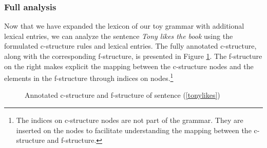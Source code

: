 \subsubsection{Full analysis}

Now that we have expanded the lexicon of our toy grammar with additional lexical entries, we can analyze the sentence \textit{Tony likes the book} using the formulated c-structure rules and lexical entries. The fully annotated c-structure, along with the corresponding f-structure, is presented in Figure \ref{fig:tonyhasreadfull}. The f-structure on the right makes explicit the mapping between the c-structure nodes and the elements in the f-structure through indices on nodes.\footnote{The indices on c-structure nodes are not part of the grammar. They are inserted on the nodes to facilitate understanding the mapping between the c-structure and f-structure.} 

\begin{figure}[H]
	\centering
	\caption{Annotated c-structure and f-structure of sentence (\ref{tonylikes})}
	\label{fig:tonyhasreadfull}
\end{figure}

